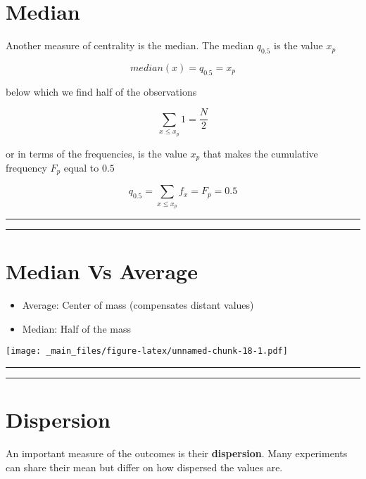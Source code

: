 \documentclass[
]{book}
\providecommand{\tightlist}{%
  \setlength{\itemsep}{0pt}\setlength{\parskip}{0pt}}
\begin{document}
\hypertarget{median}{%
\section{Median}\label{median}}

Another measure of centrality is the median. The median \(q_{0.5}\) is the value \(x_p\)

\[median(x)=q_{0.5}=x_p\]

below which we find half of the observations

\[\sum_{x\leq x_p} 1 = \frac{N}{2}\]

or in terms of the frequencies, is the value \(x_p\) that makes the cumulative frequency \(F_p\) equal to \(0.5\)

\[q_{0.5}=\sum_{x\leq x_p} f_x =F_p=0.5\]

\begin{center}\rule{0.5\linewidth}{0.5pt}\end{center}

\begin{center}\rule{0.5\linewidth}{0.5pt}\end{center}

\hypertarget{median-vs-average}{%
\section{Median Vs Average}\label{median-vs-average}}

\begin{itemize}
\tightlist
\item
  Average: Center of mass (compensates distant values)
\item
  Median: Half of the mass
\end{itemize}

\texttt{[image: \_main\_files/figure-latex/unnamed-chunk-18-1.pdf]}

\begin{center}\rule{0.5\linewidth}{0.5pt}\end{center}

\begin{center}\rule{0.5\linewidth}{0.5pt}\end{center}

\hypertarget{dispersion}{%
\section{Dispersion}\label{dispersion}}

An important measure of the outcomes is their \textbf{dispersion}. Many experiments can share their mean but differ on how dispersed the values are.
\end{document}
